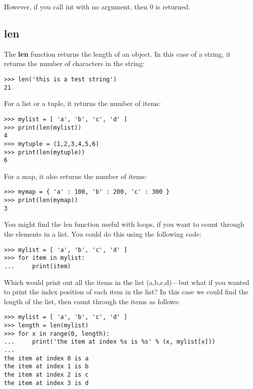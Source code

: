 \noindent
However, if you call int with no argument, then 0 is returned.

\subsection*{len}

The \textbf{len} function returns the length of an object. In this case of a string, it returns the number of characters in the string:

\begin{listing}
\begin{verbatim}
>>> len('this is a test string')
21
\end{verbatim}
\end{listing}

\noindent
For a list or a tuple, it returns the number of items:

\begin{listing}
\begin{verbatim}
>>> mylist = [ 'a', 'b', 'c', 'd' ]
>>> print(len(mylist))
4
>>> mytuple = (1,2,3,4,5,6)
>>> print(len(mytuple))
6
\end{verbatim}
\end{listing}

\noindent
For a map, it also returns the number of items:

\begin{listing}
\begin{verbatim}
>>> mymap = { 'a' : 100, 'b' : 200, 'c' : 300 }
>>> print(len(mymap))
3
\end{verbatim}
\end{listing}

\noindent
You might find the len function useful with loops, if you want to count through the elements in a list.  You could do this using the following code:

\begin{listing}
\begin{verbatim}
>>> mylist = [ 'a', 'b', 'c', 'd' ]
>>> for item in mylist:
...     print(item)
\end{verbatim}
\end{listing}

\noindent
Which would print out all the items in the list (a,b,c,d)---but what if you wanted to print the index position of each item in the list?  In this case we could find the length of the list, then count through the items as follows:

\begin{listing}
\begin{verbatim}
>>> mylist = [ 'a', 'b', 'c', 'd' ]
>>> length = len(mylist)
>>> for x in range(0, length):
...     print('the item at index %s is %s' % (x, mylist[x]))
... 
the item at index 0 is a
the item at index 1 is b
the item at index 2 is c
the item at index 3 is d
\end{verbatim}
\end{listing}

